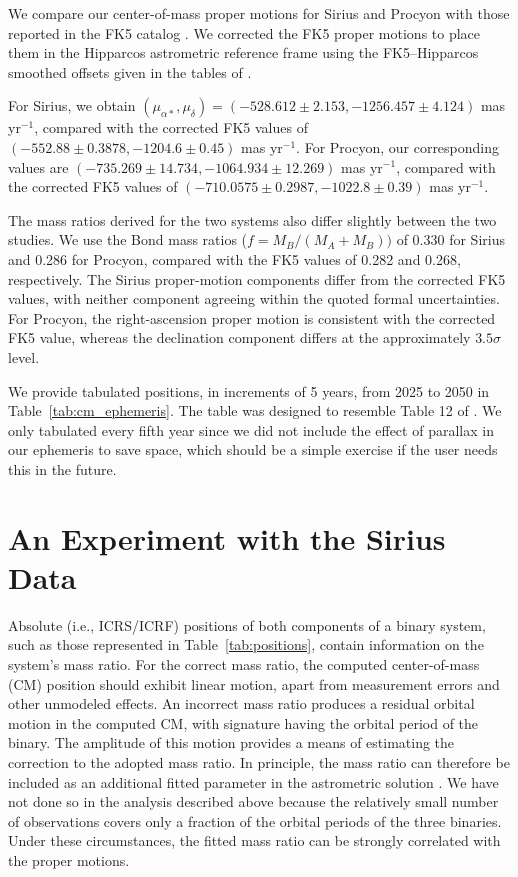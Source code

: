 \documentclass[linenumbers,trackchanges]{aastex701}
\begin{document}
We compare our center-of-mass proper motions for Sirius and Procyon with those reported in the FK5 catalog
\citep{1988VeARI..32....1F}. We corrected the FK5 proper motions to place them in the Hipparcos astrometric reference
frame using the FK5--Hipparcos smoothed offsets given in the tables of \citet{2000A&A...354..732M}. 

For Sirius, we obtain $(\mu_{\alpha*},\mu_\delta) = (-528.612 \pm 2.153,-1256.457 \pm 4.124)$ mas yr$^{-1}$, compared
with the corrected FK5 values of $(-552.88 \pm 0.3878,-1204.6 \pm 0.45)$ mas yr$^{-1}$. For Procyon, our corresponding
values are $(-735.269 \pm 14.734,-1064.934 \pm 12.269)$ mas yr$^{-1}$, compared with the corrected FK5 values of
$(-710.0575 \pm 0.2987,-1022.8 \pm 0.39)$ mas yr$^{-1}$. 

The mass ratios derived for the two systems also differ slightly between the two studies. We use the Bond
mass ratios ($f=M_B/(M_A+M_B))$ of 0.330 for Sirius and 0.286 for Procyon, compared with the FK5 values of 0.282 and 0.268,
respectively. The Sirius proper-motion components differ from the corrected FK5 values, with neither component agreeing
within the quoted formal uncertainties. For Procyon, the right-ascension proper motion is consistent with the corrected
FK5 value, whereas the declination component differs at the approximately $3.5\sigma$ level.

We provide tabulated positions, in increments of 5 years, from 2025 to 2050 in Table~\ref{tab:cm_ephemeris}. The table
was designed to resemble Table 12 of \citet{2021AJ....162...14A}. We only tabulated every fifth year since we did not
include the effect of parallax in our ephemeris to save space, which should be a simple exercise if the user needs
this in the future. 

\section{An Experiment with the Sirius Data}\label{sec:sirius_exp}

Absolute (i.e., ICRS/ICRF) positions of both components of a binary system, such as those represented in
Table~\ref{tab:positions}, contain information on the system's mass ratio. For the correct mass ratio, the computed
center-of-mass (CM) position should exhibit linear motion, apart from measurement errors and other unmodeled effects. An
incorrect mass ratio produces a residual orbital motion in the computed CM, with signature having the
orbital period of the binary. The amplitude of this motion provides a means of estimating the correction to the adopted
mass ratio. In principle, the mass ratio can therefore be included as an additional fitted parameter in the astrometric
solution \citep{Heintz1960}. We have not done so in the analysis described above because the relatively small number of observations covers
only a fraction of the orbital periods of the three binaries. Under these circumstances, the fitted mass ratio can be
strongly correlated with the proper motions. 
\end{document}
